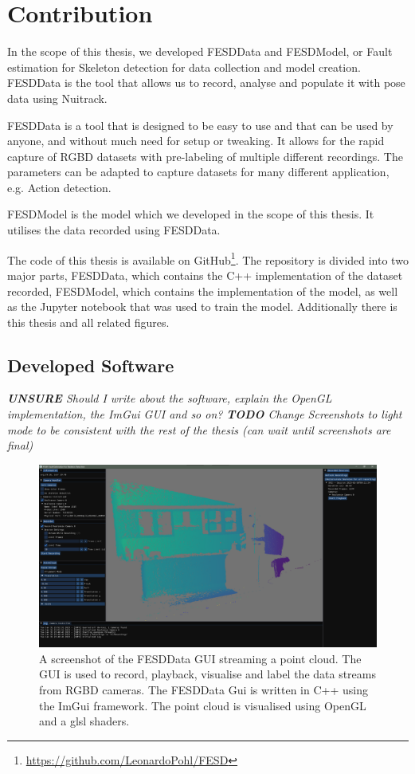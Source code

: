 \section{Contribution}
\label{sec:contribution}

In the scope of this thesis, we developed FESDData and FESDModel, or Fault estimation for Skeleton detection for data collection and model creation. FESDData is the tool that allows us to record, analyse and populate it with pose data using Nuitrack. 

FESDData is a tool that is designed to be easy to use and that can be used by anyone, and without much need for setup or tweaking. It allows for the rapid capture of RGBD datasets with pre-labeling of multiple different recordings. The parameters can be adapted to capture datasets for many different application, e.g. Action detection.

FESDModel is the model which we developed in the scope of this thesis. It utilises the data recorded using FESDData.

The code of this thesis is available on GitHub\footnote{\url{https://github.com/LeonardoPohl/FESD}}. The repository is divided into two major parts, FESDData, which contains the C++ implementation of the dataset recorded, FESDModel, which contains the implementation of the model, as well as the Jupyter notebook that was used to train the model. Additionally there is this thesis and all related figures.

\subsection{Developed Software}

\textit{\textbf{UNSURE} Should I write about the software, explain the OpenGL implementation, the ImGui GUI and so on?}
\textit{\textbf{TODO} Change Screenshots to light mode to be consistent with the rest of the thesis (can wait until screenshots are final)}

\begin{figure}[ht]
  \centering
  \includegraphics[width=\linewidth]{figures/FESD/all.png}
  \caption[FESDData GUI]{A screenshot of the FESDData GUI streaming a point cloud. The GUI is used to record, playback, visualise and label the data streams from RGBD cameras. The FESDData Gui is written in C++ using the ImGui framework. The point cloud is visualised using OpenGL and a glsl shaders.}
  \label{fig:stream_gui}
\end{figure}


